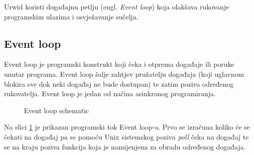 Urwid koristi događajnu petlju (engl. \emph{Event loop}) koja olakšava
rukovanje programskim ulazima i osvježavanje sučelja.

\subsection{Event loop}

Event loop je programski konstrukt koji čeka i otprema događaje ili poruke
unutar programa. Event loop šalje zahtjev pružatelju događaja (koji uglavnom
blokira sve dok neki događaj ne bude dostupan) te zatim poziva određenog
rukovatelja. Event loop je jedan od načina asinkronog programiranja.

\begin{figure}[H]
\centering
{}
\caption{Event loop schematic}
\label{fig:event_loop}
\end{figure}

Na slici \ref{fig:event_loop} je prikazan programski tok Event loop-a. Prvo se
izračuna koliko će se čekati na događaj pa se pomoću Unix sistemskog poziva
\emph{poll} čeka na događaj te se na kraju poziva funkcija koja je namijenjena za
obradu određenog događaja.

